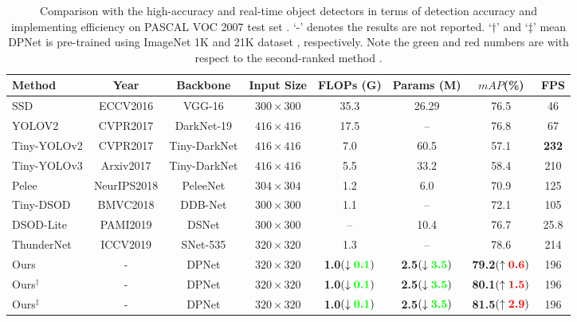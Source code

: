 \documentclass[lettersize,journal]{IEEEtran}
\begin{document}
\begin{table*}[t!] 
	\tabcolsep 4.0mm \caption{Comparison with the high-accuracy and real-time object detectors in terms of detection accuracy and implementing efficiency on PASCAL VOC 2007 test set \cite{everingham2010pascal}. ‘-’ denotes the results are not reported. ‘$\dagger$’ and ‘$\ddagger$’ mean DPNet is pre-trained using ImageNet 1K and 21K dataset \cite{deng2009imagenet}, respectively. Note the green and red numbers are with respect to the second-ranked method \cite{qin2019thundernet}.} 
	\begin{center}
		\begin{tabular}{l|c|c|c|c|c|c|c}
			\toprule Method&Year&Backbone&Input Size&FLOPs (G) & Params (M) & $mAP$(\%) & FPS\\
\midrule
			SSD\cite{liu2016ssd}&ECCV2016&VGG-16& $300\times300$ &35.3&26.29&76.5&46\\
			YOLOV2 \cite{redmon2017yolo9000} &CVPR2017& DarkNet-19 &$416\times416$&17.5&--&76.8&67\\
\midrule
			Tiny-YOLOv2\cite{redmon2017yolo9000} &CVPR2017&Tiny-DarkNet& $416\times416$& 7.0&60.5&57.1&\textbf{232} \\
			Tiny-YOLOv3\cite{redmon2018yolov3} &Arxiv2017&Tiny-DarkNet& $416\times416$& 5.5&33.2&58.4&210 \\
Pelee \cite{Pelee} &NeurIPS2018 &PeleeNet&$304\times304$  &1.2 & 6.0 &70.9&125\\
			Tiny-DSOD \cite{li2018tiny}&BMVC2018 &DDB-Net&$300\times300$  &1.1 & -- &72.1& 105\\
DSOD-Lite\cite{shen2019object} &PAMI2019& DSNet &$300\times300$  & --&10.4&76.7&25.8\\
			ThunderNet \cite{qin2019thundernet}&ICCV2019&SNet-535&$320\times320$&1.3 & -- &78.6& 214\\
\midrule
			Ours &- &DPNet&$320\times320$&\textbf{1.0}$(\downarrow\textcolor{green}{\textbf{0.1}})$ & \textbf{2.5}$(\downarrow\textcolor{green}{\textbf{3.5}})$ & \textbf{79.2}$(\uparrow\textcolor{red}{\textbf{0.6}})$  & 196\\	
			Ours$^{\dagger}$ &- &DPNet&$320\times320$&\textbf{1.0}$(\downarrow\textcolor{green}{\textbf{0.1}})$ & \textbf{2.5}$(\downarrow\textcolor{green}{\textbf{3.5}})$ & \textbf{80.1}$(\uparrow\textcolor{red}{\textbf{1.5}})$  & 196\\
			Ours$^{\ddagger}$ &- &DPNet&$320\times320$&\textbf{1.0}$(\downarrow\textcolor{green}{\textbf{0.1}})$ & \textbf{2.5}$(\downarrow\textcolor{green}{\textbf{3.5}})$ & \textbf{81.5}$(\uparrow\textcolor{red}{\textbf{2.9}})$  & 196\\	
\bottomrule
		\end{tabular}\label{tab:det_result_pascal}
	\end{center}
\end{table*}
\end{document}

